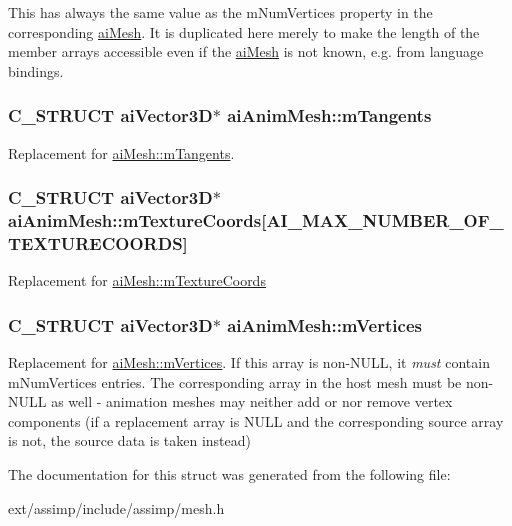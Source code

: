 This has always the same value as the m\-Num\-Vertices property in the corresponding \hyperlink{structai_mesh}{ai\-Mesh}. It is duplicated here merely to make the length of the member arrays accessible even if the \hyperlink{structai_mesh}{ai\-Mesh} is not known, e.\-g. from language bindings. \hypertarget{structai_anim_mesh_a95dcc49c6d5ecc570ceb54552a0a9625}{
\subsubsection[{m\-Tangents}]{\setlength{\rightskip}{0pt plus 5cm}C\-\_\-\-S\-T\-R\-U\-C\-T {\bf ai\-Vector3\-D}$\ast$ ai\-Anim\-Mesh\-::m\-Tangents}}\label{structai_anim_mesh_a95dcc49c6d5ecc570ceb54552a0a9625}
Replacement for \hyperlink{structai_mesh_af367ff78bd69f3e83d7edc8ad67dc5df}{ai\-Mesh\-::m\-Tangents}. \hypertarget{structai_anim_mesh_ad24a0451adeb845a53eb2351b9462e0a}{
\subsubsection[{m\-Texture\-Coords}]{\setlength{\rightskip}{0pt plus 5cm}C\-\_\-\-S\-T\-R\-U\-C\-T {\bf ai\-Vector3\-D}$\ast$ ai\-Anim\-Mesh\-::m\-Texture\-Coords\mbox{[}A\-I\-\_\-\-M\-A\-X\-\_\-\-N\-U\-M\-B\-E\-R\-\_\-\-O\-F\-\_\-\-T\-E\-X\-T\-U\-R\-E\-C\-O\-O\-R\-D\-S\mbox{]}}}\label{structai_anim_mesh_ad24a0451adeb845a53eb2351b9462e0a}
Replacement for \hyperlink{structai_mesh_a4a50b11d00ef50f419c75cab0f6bddd6}{ai\-Mesh\-::m\-Texture\-Coords} \hypertarget{structai_anim_mesh_a0ac2dd4c1afd23e6a9293b1d0ded3060}{
\subsubsection[{m\-Vertices}]{\setlength{\rightskip}{0pt plus 5cm}C\-\_\-\-S\-T\-R\-U\-C\-T {\bf ai\-Vector3\-D}$\ast$ ai\-Anim\-Mesh\-::m\-Vertices}}\label{structai_anim_mesh_a0ac2dd4c1afd23e6a9293b1d0ded3060}
Replacement for \hyperlink{structai_mesh_afd4588abb3e1c72821ae0234a3850662}{ai\-Mesh\-::m\-Vertices}. If this array is non-\/\-N\-U\-L\-L, it {\itshape must} contain m\-Num\-Vertices entries. The corresponding array in the host mesh must be non-\/\-N\-U\-L\-L as well -\/ animation meshes may neither add or nor remove vertex components (if a replacement array is N\-U\-L\-L and the corresponding source array is not, the source data is taken instead) 

The documentation for this struct was generated from the following file\-:\begin{DoxyCompactItemize}
\item 
ext/assimp/include/assimp/mesh.\-h\end{DoxyCompactItemize}
